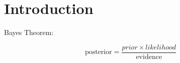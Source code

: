 \documentclass{article}
\begin{document}
\section{Introduction}


Bayes Theorem:

\[
\text{posterior} = \frac{prior \times likelihood}{\text{evidence}}
\]
\end{document}
